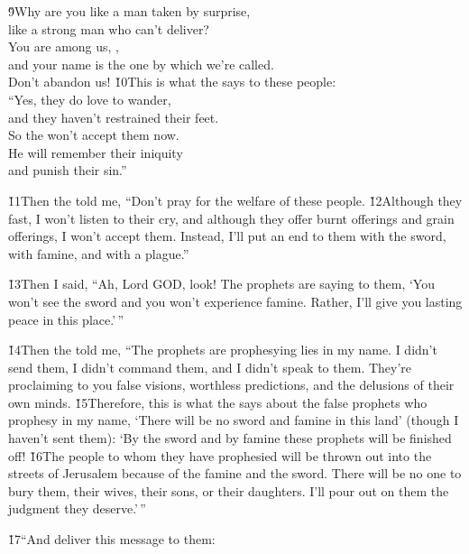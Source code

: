 \begin{poetry}
\poeml \v{9}Why are you like a man taken by surprise, \\
\poemll    like a strong man who can't deliver? \\
\poeml You are among us, , \\
\poemll    and your name is the one by which we're called. \\
\poemlll       Don't abandon us!
\poeml \v{10}This is what the  says to these people: \\
\poemll    ``Yes, they do love to wander, \\
\poemlll       and they haven't restrained their feet. \\
\poeml So the  won't accept them now. \\
\poemll    He will remember their iniquity \\
\poemlll       and punish their sin.''
\end{poetry}

\v{11}Then the  told me, ``Don't pray for the welfare of these people. \v{12}Although they fast, I won't listen to their cry, and although they offer burnt offerings and grain offerings, I won't accept them. Instead, I'll put an end to them with the sword, with famine, and with a plague.''

\v{13}Then I said, ``Ah, Lord GOD, look! The prophets are saying to them, `You won't see the sword and you won't experience famine. Rather, I'll give you lasting peace in this place.'\,''

\v{14}Then the  told me, ``The prophets are prophesying lies in my name. I didn't send them, I didn't command them, and I didn't speak to them. They're proclaiming to you false visions, worthless predictions, and the delusions of their own minds. \v{15}Therefore, this is what the  says about the false prophets who prophesy in my name, `There will be no sword and famine in this land' (though I haven't sent them): `By the sword and by famine these prophets will be finished off! \v{16}The people to whom they have prophesied will be thrown out into the streets of Jerusalem because of the famine and the sword. There will be no one to bury them, their wives, their sons, or their daughters. I'll pour out on them the judgment they deserve.'\,''

\v{17}``And deliver this message to them:

